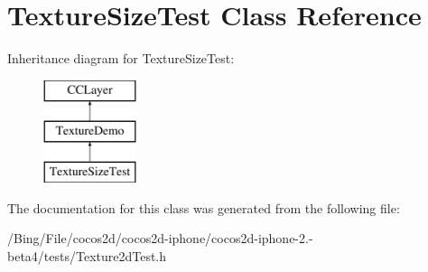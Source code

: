 \hypertarget{interface_texture_size_test}{\section{Texture\-Size\-Test Class Reference}
\label{interface_texture_size_test}
}
Inheritance diagram for Texture\-Size\-Test\-:\begin{figure}[H]
\begin{center}
\leavevmode
\includegraphics[height=3.000000cm]{interface_texture_size_test}
\end{center}
\end{figure}


The documentation for this class was generated from the following file\-:\begin{DoxyCompactItemize}
\item 
/\-Bing/\-File/cocos2d/cocos2d-\/iphone/cocos2d-\/iphone-\/2.-\/beta4/tests/Texture2d\-Test.\-h\end{DoxyCompactItemize}
